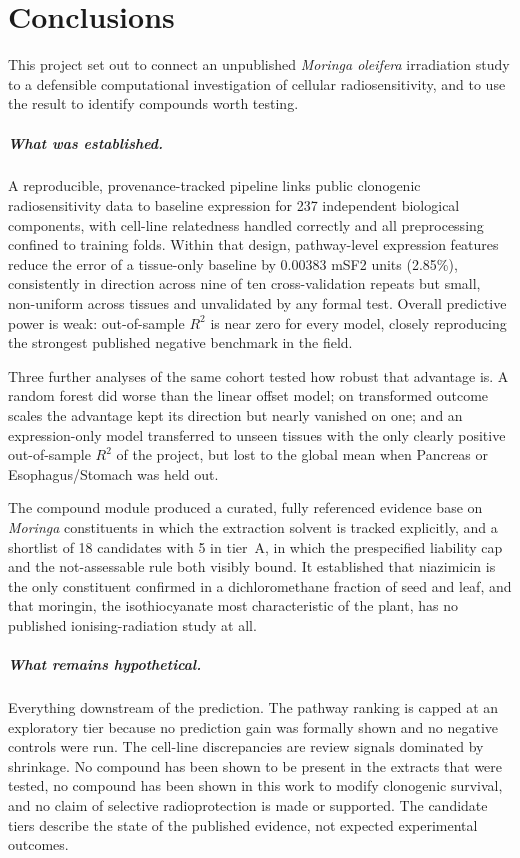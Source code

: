 \chapter{Conclusions}\label{ch:conclusion}

This project set out to connect an unpublished \textit{Moringa oleifera} irradiation study to
a defensible computational investigation of cellular radiosensitivity, and to use the result
to identify compounds worth testing.

\paragraph{What was established.} A reproducible, provenance-tracked pipeline links public
clonogenic radiosensitivity data to baseline expression for 237 independent biological
components, with cell-line relatedness handled correctly and all preprocessing confined to
training folds. Within that design, pathway-level expression features reduce the error of a
tissue-only baseline by 0.00383 mSF2 units (2.85\%), consistently in direction across nine of
ten cross-validation repeats but small, non-uniform across tissues and unvalidated by any
formal test. Overall predictive power is weak: out-of-sample $R^2$ is near zero for every
model, closely reproducing the strongest published negative benchmark in the field.

Three further analyses of the same cohort tested how robust that advantage is. A random
forest did worse than the linear offset model; on transformed outcome scales the advantage
kept its direction but nearly vanished on one; and an expression-only model transferred to
unseen tissues with the only clearly positive out-of-sample $R^2$ of the project, but lost to
the global mean when Pancreas or Esophagus/Stomach was held out.

The compound module produced a curated, fully referenced evidence base on \textit{Moringa}
constituents in which the extraction solvent is tracked explicitly, and a shortlist of 18
candidates with 5 in tier~A, in which the prespecified liability cap and the not-assessable
rule both visibly bound. It established that niazimicin is the only constituent confirmed in a
dichloromethane fraction of seed and leaf, and that moringin, the isothiocyanate most
characteristic of the plant, has no published ionising-radiation study at all.

\paragraph{What remains hypothetical.} Everything downstream of the prediction. The pathway
ranking is capped at an exploratory tier because no prediction gain was formally shown and no
negative controls were run. The cell-line discrepancies are review signals dominated by
shrinkage. No compound has been shown to be present in the extracts that were tested, no
compound has been shown in this work to modify clonogenic survival, and no claim of selective
radioprotection is made or supported. The candidate tiers describe the state of the published
evidence, not expected experimental outcomes.


